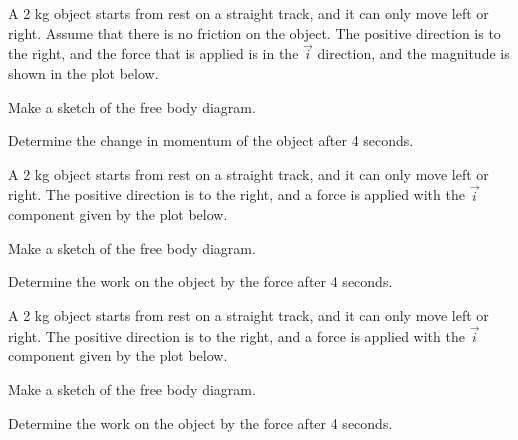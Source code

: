 \begin{problem}
\item A 2 kg object starts from rest on a straight track, and it can
  only move left or right. Assume that there is no friction on the
  object. The positive direction is to the right, and the force that
  is applied is in the $\vec{i}$ direction, and the magnitude is shown
  in the plot below.

  \scalebox{0.5}{}

  \begin{subproblem}
    \item Make a sketch of the free body diagram.
      \vspace{4em}
    \item Determine the change in momentum of the object after 4
      seconds.
      \vfill
  \end{subproblem}
  \clearpage

\item A 2 kg object starts from rest on a straight track, and it can
  only move left or right. The positive direction is to the right, and
  a force is applied with the $\vec{i}$ component given by the plot
  below.

  \scalebox{0.5}{}

  \begin{subproblem}
    \item Make a sketch of the free body diagram.
      \vspace{4em}
    \item Determine the work on the object by the force after 4
      seconds.  
      \vfill
  \end{subproblem}
  \clearpage

\item A 2 kg object starts from rest on a straight track, and it can
  only move left or right. The positive direction is to the right, and
  a force is applied with the $\vec{i}$ component given by the plot
  below.

  \scalebox{0.5}{}

  \begin{subproblem}
    \item Make a sketch of the free body diagram.
      \vspace{4em}
    \item Determine the work on the object by the force after 4
      seconds.  
      \vfill
  \end{subproblem}
  \clearpage

\end{problem}


